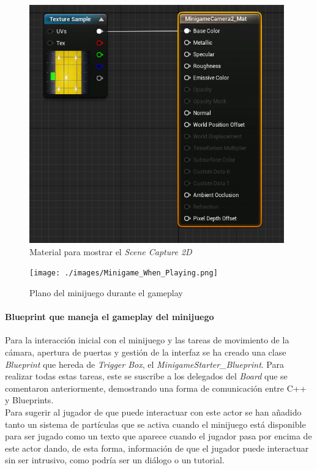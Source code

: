 \begin{figure}[H]
  \centering
  \includegraphics[width=11cm]{./images/Screen_Capture_To_Mat.png}
  \caption{Material para mostrar el \textit{Scene Capture 2D}}
  \label{SceneCapture2DMat}
\end{figure}


\begin{figure}[H]
  \centering
  \texttt{[image: ./images/Minigame\_When\_Playing.png]}
  \caption{Plano del minijuego durante el gameplay}
  \label{GameplayMinigame}
\end{figure}

\paragraph{Blueprint que maneja el gameplay del minijuego}
Para la interacción inicial con el minijuego y las tareas de movimiento de la cámara, apertura de puertas y gestión de la interfaz se ha creado una clase \textit{Blueprint} que hereda de \textit{Trigger Box}, el \textit{MinigameStarter\_Blueprint}. Para realizar todas estas tareas, este se suscribe a los delegados del \textit{Board} que se comentaron anteriormente, demostrando una forma de comunicación entre C++ y Blueprints. \\

Para sugerir al jugador de que puede interactuar con este actor se han añadido tanto un sistema de partículas que se activa cuando el minijuego está disponible para ser jugado como un texto que aparece cuando el jugador pasa por encima de este actor dando, de esta forma, información de que el jugador puede interactuar sin ser intrusivo, como podría ser un diálogo o un tutorial.


